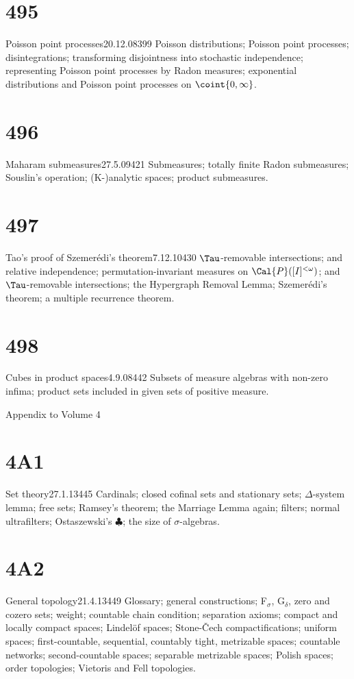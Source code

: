 \section{495}{Poisson point processes}{20.12.08}{399}{}
{Poisson distributions;  Poisson point processes;  disintegrations;
transforming disjointness into stochastic independence;  representing
Poisson point processes by Radon measures;
exponential distributions and Poisson point processes on
$\coint{0,\infty}$.}

\section{496}{Maharam submeasures}{27.5.09}{421}{}
{Submeasures;  totally finite Radon submeasures;  Souslin's operation;
(K-)analytic spaces;  product submeasures.}

\section{497}{Tao's proof of Szemer\'edi's theorem}{7.12.10}{430}{}
{$\Tau$-removable intersections;  and relative independence;
permutation-invariant measures on $\Cal{P}([I]^{<\omega})$;
and $\Tau$-removable intersections;
the Hypergraph Removal Lemma;  Szemer\'edi's theorem;  a multiple
recurrence theorem.}

\section{498}{Cubes in product spaces}{4.9.08}{442}{}
{Subsets of measure algebras with non-zero infima;  product sets
included in given sets of positive measure.}


Appendix to Volume 4


\section{4A1}{Set theory}{27.1.13}{445}{}
{Cardinals;  closed cofinal sets and stationary sets;  $\Delta$-system
lemma;  free sets;  Ramsey's theorem;  the Marriage Lemma again;  filters;
normal ultrafilters;  Ostaszewski's $\clubsuit$;
the size of $\sigma$-algebras.}

\section{4A2}{General topology}{21.4.13}{449}{}
{Glossary;  general constructions;  F$_{\sigma}$, G$_{\delta}$, zero and
cozero sets;  weight;  countable chain condition;
separation axioms;  compact and locally compact spaces;  Lindel\"of
spaces;   Stone-\v{C}ech compactifications;  uniform spaces;
first-{\vthsp}countable, sequential,
countably tight, metrizable spaces;  countable networks;
second-countable spaces;  separable
metrizable spaces;  Polish spaces;  order topologies;  Vietoris and Fell
topologies.}

